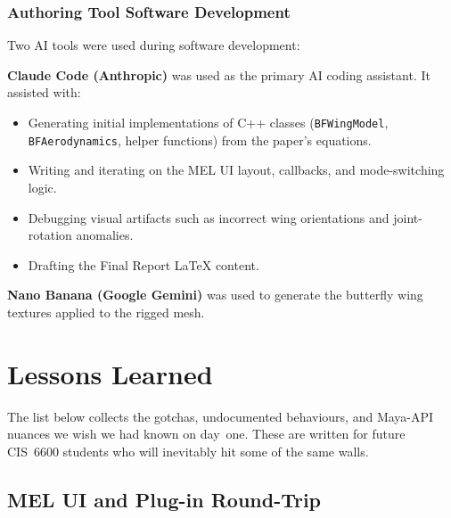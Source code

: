 \documentclass[12pt]{article}
\begin{document}
\subsubsection{Authoring Tool Software Development}

Two AI tools were used during software development:

\textbf{Claude Code (Anthropic)} was used as the primary AI coding assistant.
It assisted with:
\begin{itemize}
  \item Generating initial implementations of C++ classes
    (\texttt{BFWingModel}, \texttt{BFAerodynamics}, helper functions)
    from the paper's equations.
  \item Writing and iterating on the MEL UI layout, callbacks, and
    mode-switching logic.
  \item Debugging visual artifacts such as incorrect wing orientations
    and joint-rotation anomalies.
  \item Drafting the Final Report \LaTeX{} content.
\end{itemize}

\textbf{Nano Banana (Google Gemini)} was used to generate the butterfly
wing textures applied to the rigged mesh.

\section{Lessons Learned}

The list below collects the gotchas, undocumented behaviours, and Maya-API
nuances we wish we had known on day~one.  These are written for future
CIS~6600 students who will inevitably hit some of the same walls.

\subsection*{MEL UI and Plug-in Round-Trip}
\end{document}
